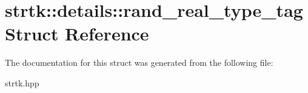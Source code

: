 \hypertarget{structstrtk_1_1details_1_1rand__real__type__tag}{\section{strtk\-:\-:details\-:\-:rand\-\_\-real\-\_\-type\-\_\-tag Struct Reference}
\label{structstrtk_1_1details_1_1rand__real__type__tag}
}


The documentation for this struct was generated from the following file\-:\begin{DoxyCompactItemize}
\item 
strtk.\-hpp\end{DoxyCompactItemize}
